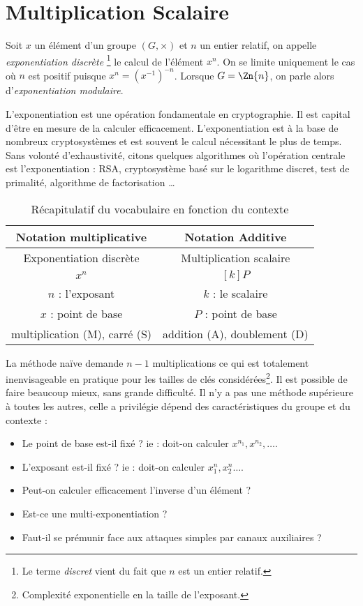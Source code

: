 \chapter{Multiplication Scalaire}
Soit $x$ un élément d'un groupe $(G, \times)$ et $n$ un entier relatif, on appelle \emph{exponentiation discrète} \footnote{Le terme \emph{discret} vient du fait que $n$ est un entier relatif.} le calcul de l'élément $x^n$. On se limite uniquement le cas où $n$ est positif puisque $x^n = (x^{-1})^{-n}$. Lorsque $G = \Zn{n}$, on parle alors d'\emph{exponentiation modulaire}.

L'exponentiation est une opération fondamentale en cryptographie. Il est capital d'être en mesure de la calculer efficacement. L'exponentiation est à la base de nombreux cryptosystèmes et est souvent le calcul nécessitant le plus de temps. Sans volonté d'exhaustivité, citons quelques algorithmes où l'opération centrale est l'exponentiation : RSA, cryptosystème basé sur le logarithme discret, test de primalité, algorithme de factorisation \ldots


\begin{table}[h]
\begin{center}
\begin{tabular}{c||c}
Notation multiplicative & Notation Additive \\
\hline \hline
Exponentiation discrète & Multiplication scalaire \\
$x^n$ & $[k]P$ \\
$n$ : l'exposant & $k$ : le scalaire \\
$x$ : point de base & $P$ : point de base \\
multiplication (M), carré (S) & addition (A), doublement (D) \\
\end{tabular}
\caption{Récapitulatif du vocabulaire en fonction du contexte}
\end{center}
\end{table}

La méthode naïve demande $n-1$ multiplications ce qui est totalement inenvisageable en pratique pour les tailles de clés considérées\footnote{Complexité exponentielle en la taille de l'exposant.}. Il est possible de faire beaucoup mieux, sans grande difficulté. Il n'y a pas une méthode supérieure à toutes les autres, celle a privilégie dépend des caractéristiques du groupe et du contexte : 
\begin{itemize}[label=--]
    \item Le point de base est-il fixé ? ie : doit-on calculer $x^{n_1}, x^{n_2}, \ldots$.
    \item L'exposant est-il fixé ? ie : doit-on calculer $x_1^{n}, x_2^{n} \ldots$.
    \item Peut-on calculer efficacement l'inverse d'un élément ?
    \item Est-ce une multi-exponentiation ?
    \item Faut-il se prémunir face aux attaques simples par canaux auxiliaires ?
\end{itemize}   

